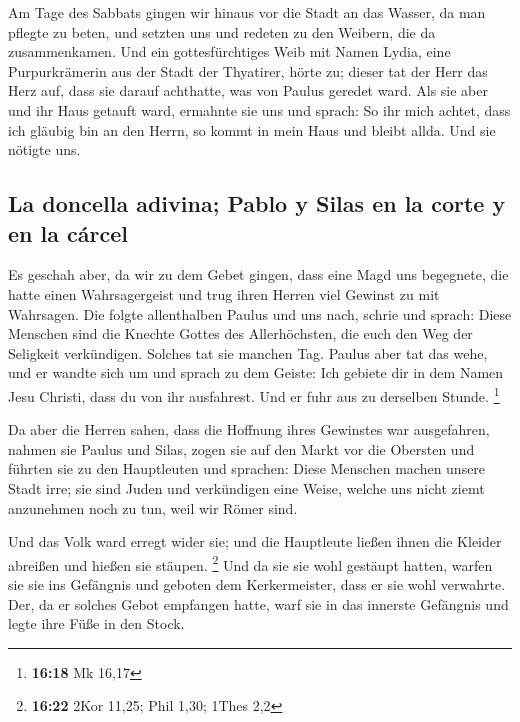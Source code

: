  Am Tage des Sabbats gingen wir hinaus vor die Stadt an
das Wasser, da man pflegte zu beten, und setzten uns und redeten zu den
Weibern, die da zusammenkamen.  Und ein gottesfürchtiges
Weib mit Namen Lydia, eine Purpurkrämerin aus der Stadt der Thyatirer,
hörte zu; dieser tat der Herr das Herz auf, dass sie darauf achthatte,
was von Paulus geredet ward.  Als sie aber und ihr Haus
getauft ward, ermahnte sie uns und sprach: So ihr mich achtet, dass ich
gläubig bin an den Herrn, so kommt in mein Haus und bleibt allda. Und
sie nötigte uns.

\hypertarget{la-doncella-adivina-pablo-y-silas-en-la-corte-y-en-la-cuxe1rcel}{%
\subsection{La doncella adivina; Pablo y Silas en la corte y en la
cárcel}\label{la-doncella-adivina-pablo-y-silas-en-la-corte-y-en-la-cuxe1rcel}}

 Es geschah aber, da wir zu dem Gebet gingen, dass eine
Magd uns begegnete, die hatte einen Wahrsagergeist und trug ihren Herren
viel Gewinst zu mit Wahrsagen.  Die folgte allenthalben
Paulus und uns nach, schrie und sprach: Diese Menschen sind die Knechte
Gottes des Allerhöchsten, die euch den Weg der Seligkeit verkündigen.
 Solches tat sie manchen Tag. Paulus aber tat das wehe,
und er wandte sich um und sprach zu dem Geiste: Ich gebiete dir in dem
Namen Jesu Christi, dass du von ihr ausfahrest. Und er fuhr aus zu
derselben Stunde. \footnote{\textbf{16:18} Mk 16,17}

 Da aber die Herren sahen, dass die Hoffnung ihres
Gewinstes war ausgefahren, nahmen sie Paulus und Silas, zogen sie auf
den Markt vor die Obersten  und führten sie zu den
Hauptleuten und sprachen: Diese Menschen machen unsere Stadt irre; sie
sind Juden  und verkündigen eine Weise, welche uns nicht
ziemt anzunehmen noch zu tun, weil wir Römer sind.

 Und das Volk ward erregt wider sie; und die Hauptleute
ließen ihnen die Kleider abreißen und hießen sie stäupen. \footnote{\textbf{16:22}
  2Kor 11,25; Phil 1,30; 1Thes 2,2}  Und da sie sie wohl
gestäupt hatten, warfen sie sie ins Gefängnis und geboten dem
Kerkermeister, dass er sie wohl verwahrte.  Der, da er
solches Gebot empfangen hatte, warf sie in das innerste Gefängnis und
legte ihre Füße in den Stock.

